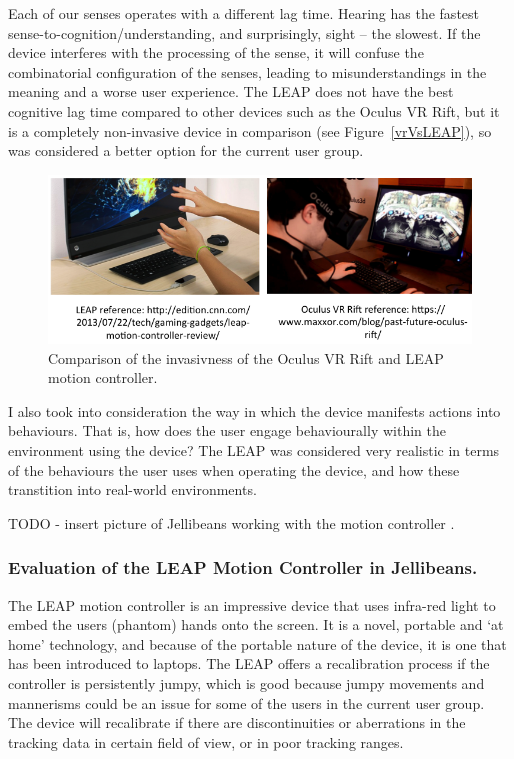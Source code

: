 \documentclass[a4paper, 11pt]{article}
\begin{document}
\vspace{5mm}
Each of our senses operates with a different lag time. Hearing has the fastest sense-to-cognition/understanding, and surprisingly, sight -- the slowest. If the device interferes with the processing of the sense, it will confuse the combinatorial configuration of the senses, leading to misunderstandings in the meaning and a worse user experience. The LEAP does not have the best cognitive lag time compared to other devices such as the Oculus VR Rift, but it is a completely non-invasive device in comparison (see Figure~\ref{vrVsLEAP}), so was considered a better option for the current user group.

\begin{figure}[H]
\begin{center}
\includegraphics[scale=0.5]{VRvsLEAP}
\caption{Comparison of the invasivness of the Oculus VR Rift and LEAP motion controller.}
\label{saveScores}
\end{center}
\end{figure}

I also took into consideration the way in which the device manifests actions into behaviours. That is, how does the user engage behaviourally within the environment using the device? The LEAP was considered very realistic in terms of the behaviours the user uses when operating the device, and how these transtition into real-world environments.

\vspace{5mm}
TODO - insert picture of Jellibeans working with the motion controller .

\subsubsection {Evaluation of the LEAP Motion Controller in Jellibeans.}
The LEAP motion controller is an impressive device that uses infra-red light to embed the users (phantom) hands onto the screen. It is a novel, portable and `at home' technology, and because of the portable nature of the device, it is one that has been introduced to laptops. The LEAP offers a recalibration process if the controller is persistently jumpy, which is good because jumpy movements and mannerisms could be an issue for some of the users in the current user group. The device will recalibrate if there are discontinuities or aberrations in the tracking data in certain field of view, or in poor tracking ranges. 
\end{document}
